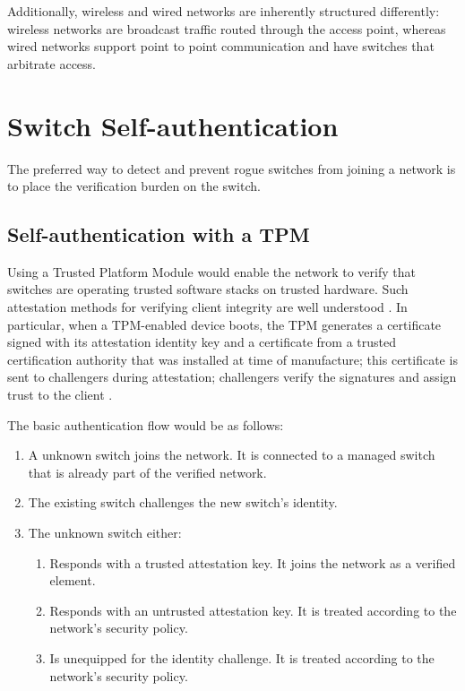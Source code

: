 \documentclass[journal]{IEEEtran}
\begin{document}
Additionally, wireless and wired networks are inherently structured differently: wireless networks
are broadcast traffic routed through the access point, whereas wired networks support point to
point communication and have switches that arbitrate access.



\section{Switch Self-authentication}
The preferred way to detect and prevent rogue switches from joining a network is to place the
verification burden on the switch.

\subsection{Self-authentication with a TPM}
Using a Trusted Platform Module would enable the network to
verify that switches are operating trusted software stacks on trusted hardware. Such attestation
methods for verifying client integrity are well understood \cite{b6}. In particular, when a
TPM-enabled device boots, the TPM generates a certificate signed with its attestation identity
key and a certificate from a trusted certification authority that was installed at time of
manufacture; this certificate is sent to challengers during attestation; challengers verify the
signatures and assign trust to the client \cite{b7}.

The basic authentication flow would be as follows:
\begin{enumerate}
  \item A unknown switch joins the network. It is connected to a managed switch that is already
  part of the verified network.
  \item The existing switch challenges the new switch's identity.
  \item The unknown switch either:
  \begin{enumerate}
    \item Responds with a trusted attestation key. It joins the network as a verified element.
    \item Responds with an untrusted attestation key. It is treated according to the network's
    security policy.
    \item Is unequipped for the identity challenge. It is treated according to the network's
    security policy.
  \end{enumerate}
\end{enumerate}
\end{document}
